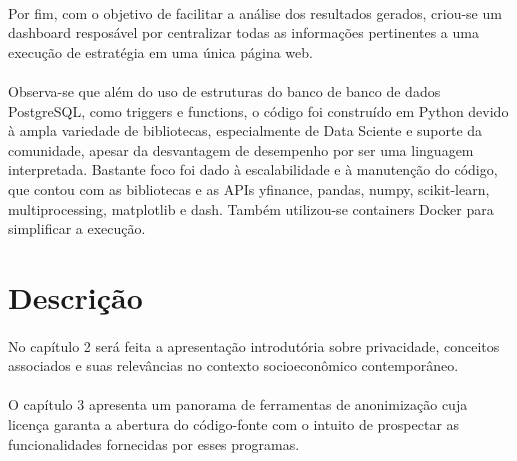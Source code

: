 \paragraph{} Por fim, com o objetivo de facilitar a análise dos resultados gerados, criou-se um dashboard resposável por centralizar todas as informações pertinentes a uma execução de estratégia em uma única página web.

\paragraph{} Observa-se que além do uso de estruturas do banco de banco de dados PostgreSQL, como triggers e functions, o código foi construído em Python devido à ampla variedade de bibliotecas, especialmente de Data Sciente e suporte da comunidade, apesar da desvantagem de desempenho por ser uma linguagem interpretada. Bastante foco foi dado à escalabilidade e à manutenção do código, que contou com as bibliotecas e as APIs yfinance, pandas, numpy, scikit-learn, multiprocessing, matplotlib e dash. Também utilizou-se containers Docker para simplificar a execução.

\section{Descrição}

\paragraph{}No capítulo 2 será feita a apresentação introdutória sobre
privacidade, conceitos associados e suas relevâncias no contexto socioeconômico
contemporâneo.

\paragraph{}O capítulo 3 apresenta um panorama de ferramentas de anonimização
cuja licença garanta a abertura do código-fonte com o intuito de prospectar as
funcionalidades fornecidas por esses programas.
